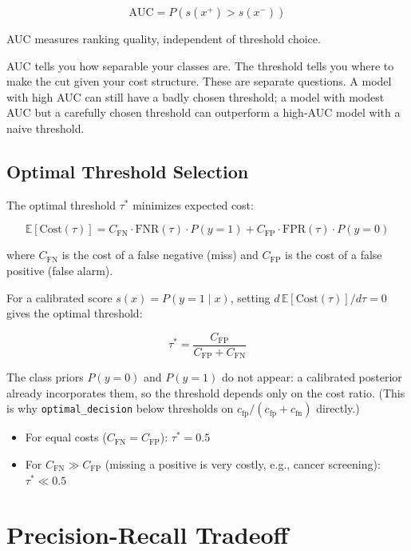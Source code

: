 \[
\mathrm{AUC} = P\!\left(s(x^+) > s(x^-)\right)
\]

AUC measures ranking quality, independent of threshold choice.

\begin{keyconcept}
AUC tells you how separable your classes are. The threshold tells you where to make the cut given your cost structure. These are separate questions. A model with high AUC can still have a badly chosen threshold; a model with modest AUC but a carefully chosen threshold can outperform a high-AUC model with a naive threshold.
\end{keyconcept}

\subsection{Optimal Threshold Selection}
\label{sec:roc-optimal-threshold}

The optimal threshold $\tau^*$ minimizes expected cost:

\[
\mathbb{E}[\mathrm{Cost}(\tau)] = C_{\mathrm{FN}} \cdot \mathrm{FNR}(\tau) \cdot P(y=1) + C_{\mathrm{FP}} \cdot \mathrm{FPR}(\tau) \cdot P(y=0)
\]

where $C_{\mathrm{FN}}$ is the cost of a false negative (miss) and $C_{\mathrm{FP}}$ is the cost of a false positive (false alarm).

For a calibrated score $s(x) = P(y=1 \mid x)$, setting $d\,\mathbb{E}[\mathrm{Cost}(\tau)]/d\tau = 0$ gives the optimal threshold:

\[
\tau^* = \frac{C_{\mathrm{FP}}}{C_{\mathrm{FP}} + C_{\mathrm{FN}}}
\]

The class priors $P(y=0)$ and $P(y=1)$ do not appear: a calibrated posterior already incorporates them, so the threshold depends only on the cost ratio. (This is why \texttt{optimal\_decision} below thresholds on $c_{\mathrm{fp}}/(c_{\mathrm{fp}}+c_{\mathrm{fn}})$ directly.)

\begin{itemize}
    \item For equal costs ($C_{\mathrm{FN}} = C_{\mathrm{FP}}$): $\tau^* = 0.5$
    \item For $C_{\mathrm{FN}} \gg C_{\mathrm{FP}}$ (missing a positive is very costly, e.g., cancer screening): $\tau^* \ll 0.5$
\end{itemize}

\section{Precision-Recall Tradeoff}

